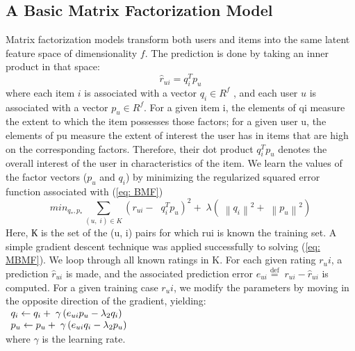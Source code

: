 \documentclass[conference]{IEEEtran}
\begin{document}
\subsection{A Basic Matrix Factorization Model  }
Matrix factorization models transform both users and items into the same latent feature space of dimensionality $f$. The prediction is done by taking an inner product in that space: 
\begin{equation}
{\hat r_{ui}} = q_i^T{p_u} 
\label{eq: BMF}
\end{equation}
where each item $i$ is associated with a vector ${q_i} \in {R^f}$ , and each user $u$ is associated with a vector ${p_u} \in {R^f}$. For a given item i, the elements of qi
measure the extent to which the item possesses those factors; for a given user u, the elements of pu measure the extent of interest the user has in items that are high on the corresponding factors. Therefore, their dot product $q_i^T{p_u}$ denotes the overall interest of the user in characteristics of the item.
We learn the values of the factor vectors (${p_u}$ and ${q_i}$) by minimizing the regularized squared error function associated with (\ref{eq: BMF})
\begin{equation}
mi{n_{{q_*},{p_*}}}\mathop \sum \limits_{\left( {u,\;i} \right) \in K} {\left( {{r_{ui}} - \;\;q_i^T{p_u}} \right)^2} + \;\lambda \left( {\;{{\left\| {{q_i}} \right\|}^2} + \;{{\left\| {{p_u}} \right\|}^2}} \right)
\label{eq: MBMF}
\end{equation}
Here, К is the set of the (u, i) pairs for which rui is known the training set. A simple gradient descent technique was applied successfully to solving (\ref{eq: MBMF}).
We loop through all known ratings in K. For each given rating $r_ui$, a prediction $\hat r_{ui}$ is made, and the associated prediction error ${e_{ui}} \stackrel{\text{def}}{=} \;{r_{ui}} - \hat r_{ui}$ is computed. For a given training case $r_ui$, we modify the parameters by moving in the opposite direction of the gradient, yielding:
\\
$\begin{array}{l}{q_i} \leftarrow {q_i} + {\rm{\;}}\gamma \left( {{e_{ui}}{p_u} - {\lambda _2}{q_i}} \right)\\{p_u} \leftarrow {p_u} + {\rm{\;}}\gamma \left( {{e_{ui}}{q_i} - {\lambda _2}{p_u}} \right)\end{array}
$
\\
where $\gamma$ is the learning rate.
\end{document}
